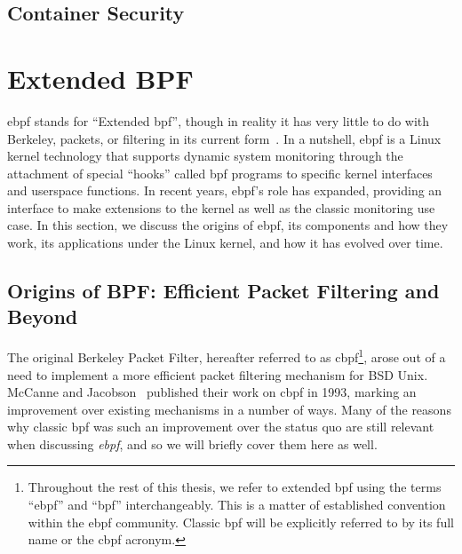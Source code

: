 \subsection{Container Security}%
\label{ss:container-security-bg}







\section{Extended BPF}%
\label{s:ebpf-bg}

\gls{ebpf} stands for \enquote{Extended \gls{bpf}}, though in reality it has very
little to do with Berkeley, packets, or filtering in its current
form~\cite{gregg2019_bpf}. In a nutshell, \gls{ebpf} is a Linux kernel technology that supports
dynamic system monitoring through the attachment of special \enquote{hooks} called \gls{bpf}
programs to specific kernel interfaces and userspace functions. In recent years, \gls{ebpf}'s
role has expanded, providing an interface to make extensions to the kernel as well as the
classic monitoring use case. In this section, we discuss the origins of \gls{ebpf}, its
components and how they work, its applications under the Linux kernel, and how it has
evolved over time.


\subsection{Origins of BPF\@: Efficient Packet Filtering and Beyond}%
\label{ss:origins-of-bpf-bg}

The original Berkeley Packet Filter, hereafter referred to as \gls{cbpf}\footnote{%
Throughout the rest of this thesis, we refer to extended \gls{bpf} using the terms
\enquote{\gls{ebpf}} and \enquote{\gls{bpf}} interchangeably. This is a matter of established
convention within the \gls{ebpf} community. Classic \gls{bpf} will be explicitly referred to by its
full name or the \gls{cbpf} acronym.}, arose out of a need to implement a more efficient packet
filtering mechanism for BSD Unix.  McCanne and Jacobson~\cite{mccanne1993_bpf} published
their work on \gls{cbpf} in 1993, marking an improvement over existing mechanisms in a number of
ways. Many of the reasons why classic \gls{bpf} was such an improvement over the status quo are
still relevant when discussing \textit{\gls{ebpf}}, and so we will briefly cover them here as
well.

